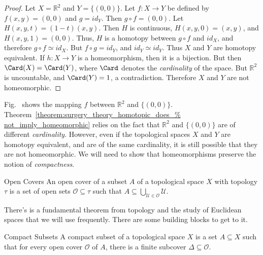 \documentclass[crop=false,class=book,oneside]{standalone}
\begin{document}
            \begin{proof}
                Let $X=\mathbb{R}^{2}$ and $Y=\{(0,0)\}$.
                Let $f:{X}\rightarrow{Y}$ be defined by
                $f(x,y)=(0,0)$ and $g=id_{Y}$. Then
                $g\circ{f}=(0,0)$. Let $H(x,y,t)=(1-t)(x,y)$.
                Then $H$ is continuous, $H(x,y,0)=(x,y)$,
                and $H(x,y,1)=(0,0)$. Thus, $H$ is a
                homotopy between ${g}\circ{f}$ and $id_{X}$, and
                therefore ${g}\circ{f}\simeq{id_{X}}$. But
                ${f}\circ{g}=id_{Y}$, and ${id_{Y}}\simeq{id_{Y}}$.
                Thus $X$ and $Y$ are homotopy equivalent.
                If $h:{X}\rightarrow{Y}$ is a homeomorphism, then it is a
                bijection. But then $\Card(X)=\Card(Y)$,
                where $\Card$ denotes the \textit{cardinality} of the space.
                But $\mathbb{R}^{2}$ is uncountable, and $\Card(Y)=1$,
                a contradiction. Therefore $X$ and $Y$ are not homeomorphic.
            \end{proof}
            Fig.~
            shows the mapping $f$ between $\mathbb{R}^{2}$ and
            $\{(0,0)\}$.
            Theorem~\ref{theorem:surgery_theory_homotopic_does_%
                         not_imply_homeomorphic}
            relies on the fact that $\mathbb{R}^{2}$ and $\{(0,0)\}$
            are of different \textit{cardinality}. However, even
            if the topological spaces $X$ and $Y$ are homotopy
            equivalent, and are of the same cardinality, it is
            still possible that they are not homeomorphic.
            We will need to show that homeomorphisms preserve
            the notion of \textit{compactness}.
            \begin{ldefinition}{Open Covers}
                An open cover of a subset $A$ of a topological
                space $X$ with topology $\tau$
                is a set of open sets
                $\mathcal{O}\subseteq\tau$ such that
                $A\subseteq\bigcup_{\mathcal{U}\in\mathcal{O}}\mathcal{U}$.
            \end{ldefinition}
            There's is a fundamental theorem from topology and
            the study of Euclidean spaces that we will use frequently.
            There are some building blocks to get to it.
            \begin{ldefinition}{Compact Subsets}
                A compact subset of a topological space $X$ is a
                set $A\subseteq{X}$ such that for every open cover
                $\mathcal{O}$ of $A$, there is a finite subcover
                $\Delta\subseteq\mathcal{O}$.
            \end{ldefinition}
\end{document}
